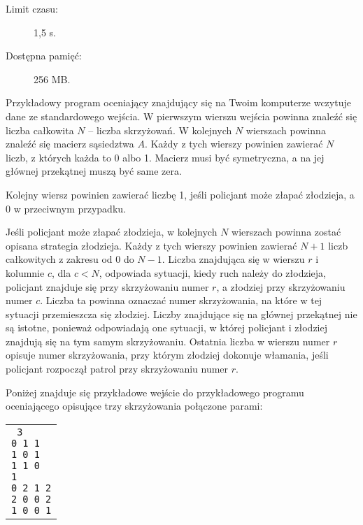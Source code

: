 \documentclass{boi2014-pl}
\begin{document}
    \Constraints
    
    \begin{description}
        \item[Limit czasu:] 1,5 s.
        \item[Dostępna pamięć:] 256 MB.
    \end{description}

    \Experimentation
    Przykładowy program oceniający znajdujący się na Twoim komputerze
    wczytuje dane ze standardowego wejścia.
    W pierwszym wierszu wejścia powinna znaleźć się liczba całkowita $N$ -- liczba skrzyżowań.
    W kolejnych $N$ wierszach powinna znaleźć się macierz sąsiedztwa $A$.
    Każdy z tych wierszy powinien zawierać $N$ liczb, z których każda to 0 albo 1.
    Macierz musi być symetryczna, a na jej głównej przekątnej muszą być same zera.

    Kolejny wiersz powinien zawierać liczbę 1, jeśli policjant może złapać złodzieja,
    a 0 w przeciwnym przypadku.

    Jeśli policjant może złapać złodzieja, w kolejnych $N$ wierszach powinna zostać
    opisana strategia złodzieja.
    Każdy z tych wierszy powinien zawierać 
    $N+1$ liczb całkowitych z zakresu od 0 do $N-1$.
    Liczba znajdująca się w wierszu $r$ i kolumnie $c$, dla $c < N$,
    odpowiada sytuacji, kiedy ruch należy do złodzieja, policjant
    znajduje się przy skrzyżowaniu numer $r$, a złodziej przy skrzyżowaniu numer $c$.
    Liczba ta powinna oznaczać numer skrzyżowania, na które w tej sytuacji
    przemieszcza się złodziej.
    Liczby znajdujące się na głównej przekątnej nie są istotne, ponieważ odpowiadają one
    sytuacji, w której policjant i złodziej znajdują się na tym samym skrzyżowaniu.
    Ostatnia liczba w wierszu numer $r$ opisuje numer skrzyżowania, przy którym
    złodziej dokonuje włamania, jeśli policjant rozpoczął patrol przy skrzyżowaniu numer $r$.

    Poniżej znajduje się przykładowe wejście do przykładowego programu oceniającego
    opisujące trzy skrzyżowania połączone parami:

    \begin{center}
        \begin{tabular}{p{4cm}}
            {\tt
                3 \newline
                0 1 1 \newline
                1 0 1 \newline
                1 1 0 \newline
                1 \newline
                0 2 1 2 \newline
                2 0 0 2 \newline
                1 0 0 1 \newline
            }
        \end{tabular}
    \end{center}
\end{document}
